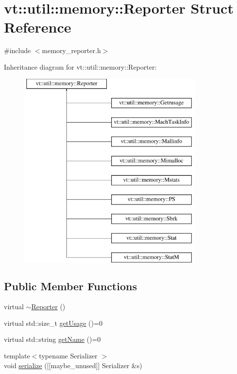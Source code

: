 \hypertarget{structvt_1_1util_1_1memory_1_1_reporter}{}\section{vt\+:\+:util\+:\+:memory\+:\+:Reporter Struct Reference}
\label{structvt_1_1util_1_1memory_1_1_reporter}


{\ttfamily \#include $<$memory\+\_\+reporter.\+h$>$}

Inheritance diagram for vt\+:\+:util\+:\+:memory\+:\+:Reporter\+:\begin{figure}[H]
\begin{center}
\leavevmode
\includegraphics[height=10.000000cm]{structvt_1_1util_1_1memory_1_1_reporter}
\end{center}
\end{figure}
\subsection*{Public Member Functions}
\begin{DoxyCompactItemize}
\item 
virtual \hyperlink{structvt_1_1util_1_1memory_1_1_reporter_a9b5c8c4345a2e1d758fd9f583d5ea63a}{$\sim$\+Reporter} ()
\item 
virtual std\+::size\+\_\+t \hyperlink{structvt_1_1util_1_1memory_1_1_reporter_a372574f51fdb68077cd3d227ee373de5}{get\+Usage} ()=0
\item 
virtual std\+::string \hyperlink{structvt_1_1util_1_1memory_1_1_reporter_a83fc36e9cff3ce2deedf1d4546694713}{get\+Name} ()=0
\item 
{\footnotesize template$<$typename Serializer $>$ }\\void \hyperlink{structvt_1_1util_1_1memory_1_1_reporter_a7a4d509bd3dabcd5dc3bc6aabc123c37}{serialize} (\mbox{[}\mbox{[}maybe\+\_\+unused\mbox{]}\mbox{]} Serializer \&s)
\end{DoxyCompactItemize}



